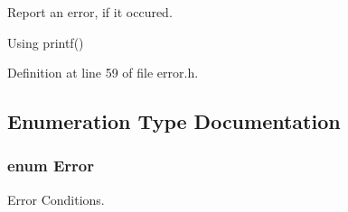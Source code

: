 Report an error, if it occured. 

Using printf() 

Definition at line 59 of file error.\-h.



\subsection{Enumeration Type Documentation}
\hypertarget{group__error_ga2c3e4bb40f36b262a5214e2da2bca9c5}{
\subsubsection[{Error}]{\setlength{\rightskip}{0pt plus 5cm}enum {\bf Error}}}\label{group__error_ga2c3e4bb40f36b262a5214e2da2bca9c5}


Error Conditions. 


